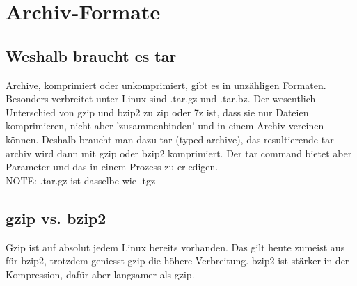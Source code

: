 \documentclass[10pt,paper=a4,final]{scrartcl}
\begin{document}
\section{Archiv-Formate}
\subsection{Weshalb braucht es tar}
Archive, komprimiert oder unkomprimiert, gibt es in unz\"ahligen Formaten. Besonders verbreitet unter Linux sind .tar.gz und .tar.bz. Der wesentlich Unterschied von gzip und bzip2 zu zip oder 7z ist, dass sie nur Dateien komprimieren, nicht aber 'zusammenbinden' und in einem Archiv vereinen k\"onnen. Deshalb braucht man dazu tar (typed archive), das resultierende tar archiv wird dann mit gzip oder bzip2 komprimiert. Der tar command bietet aber Parameter und das in einem Prozess zu erledigen.\\
NOTE: .tar.gz ist dasselbe wie .tgz
\subsection{gzip vs. bzip2}
Gzip ist auf absolut jedem Linux bereits vorhanden. Das gilt heute zumeist aus f\"ur bzip2, trotzdem geniesst gzip die h\"ohere Verbreitung. bzip2 ist st\"arker in der Kompression, daf\"ur aber langsamer als gzip.
\end{document}
